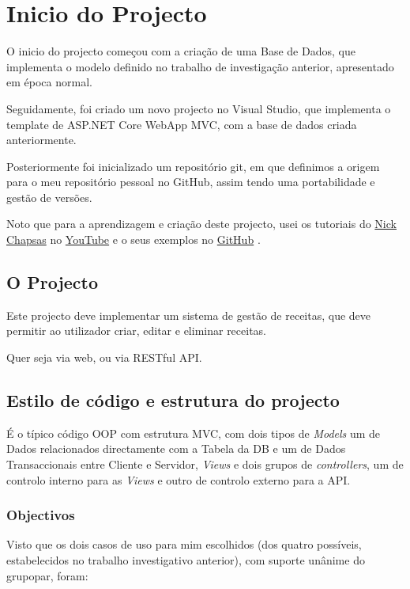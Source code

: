 \chapter{Inicio do Projecto}

O inicio do projecto começou com a criação de uma Base de Dados, que implementa o modelo definido no trabalho de investigação anterior, apresentado em época normal.

Seguidamente, foi criado um novo projecto no Visual Studio, que implementa o template de ASP.NET Core WebApp MVC, com a base de dados criada anteriormente.

Posteriormente foi inicializado um repositório git, em que definimos a origem para o meu repositório pessoal no GitHub, assim tendo uma portabilidade e gestão de versões.

Noto que para a aprendizagem e criação deste projecto, usei os tutoriais do \href{https:\/\/www.linkedin.com\/in\/nick-chapsas}{Nick Chapsas} \cite{nickLI} no \href{https:\/\/www.youtube.com\/c\/Elfocrash}{YouTube} \cite{nickYT} e o seus exemplos no \href{https:\/\/github.com\/Elfocrash}{GitHub} \cite{nickGH}.

\section{O Projecto}

Este projecto deve implementar um sistema de gestão de receitas, que deve permitir ao utilizador criar, editar e eliminar receitas.

Quer seja via web, ou via RESTful API.

\section{Estilo de código e estrutura do   projecto}

É o típico código OOP com estrutura MVC, com dois tipos de \textit{Models} um de Dados relacionados directamente com a Tabela da DB e um de Dados Transaccionais entre Cliente e Servidor, \textit{Views} e dois grupos de \textit{\textit{controllers}}, um de controlo interno para as \textit{Views} e outro de controlo externo para a API.

\subsection{Objectivos}

Visto que os dois casos de uso para mim escolhidos (dos quatro possíveis, estabelecidos no trabalho investigativo anterior), com suporte unânime do grupo\/par, foram:

